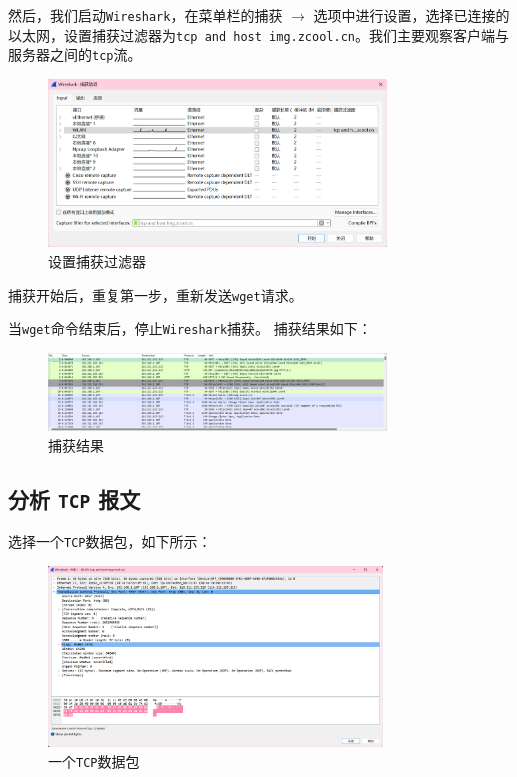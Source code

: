 \documentclass{article}
\begin{document}
然后，我们启动\texttt{Wireshark}，在菜单栏的捕获 \( \to \) 选项中进行设置，选择已连接的以太网，设置捕获过滤器为\texttt{tcp and host img.zcool.cn}。我们主要观察客户端与服务器之间的\texttt{tcp}流。

\begin{figure}[H]
  \centering
  \includegraphics[width=0.8\textwidth]{img/2.png}
  \caption{设置捕获过滤器}
\end{figure}

捕获开始后，重复第一步，重新发送\texttt{wget}请求。

当\texttt{wget}命令结束后，停止\texttt{Wireshark}捕获。
捕获结果如下：

\begin{figure}[H]
  \centering
  \includegraphics[width=0.8\textwidth]{img/4.png}
  \caption{捕获结果}
\end{figure}


\subsection{分析 \texttt{TCP} 报文}

选择一个\texttt{TCP}数据包，如下所示：

\begin{figure}[H]
  \centering
  \includegraphics[width=0.79\textwidth]{img/5.png}
  \caption{一个\texttt{TCP}数据包}
\end{figure}
\end{document}

